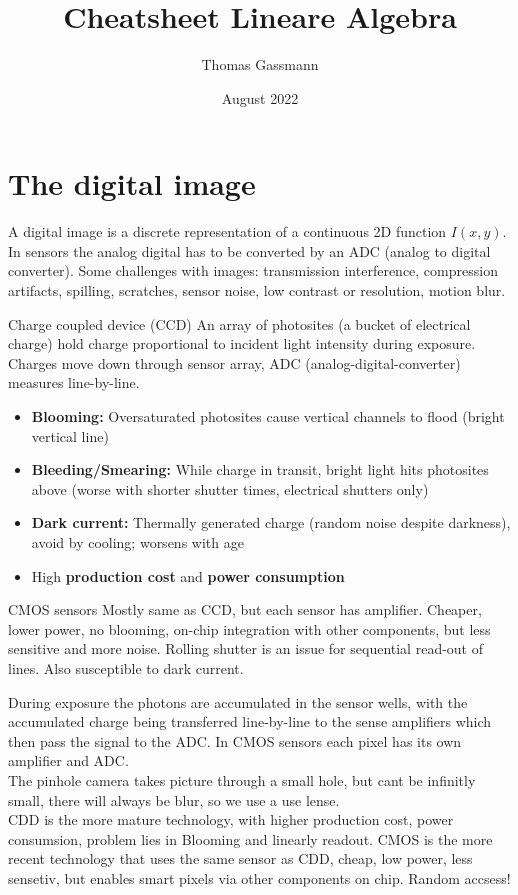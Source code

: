 \documentclass[a4paper,9pt]{article}
\title{Cheatsheet Lineare Algebra}
\author{Thomas Gassmann}
\date{August 2022}
\begin{document}
\section{The digital image}
A digital image is a discrete representation of a continuous 2D function $I(x,y)$. In sensors the analog digital has to be converted by an ADC (analog to digital converter). 
Some challenges with images: transmission interference, compression artifacts, spilling, scratches, sensor noise, low contrast or resolution, motion blur.
\begin{subbox}{Charge coupled device (CCD)}
An array of photosites (a bucket of electrical charge) hold charge proportional to incident light intensity during exposure. Charges move down through sensor array, ADC (analog-digital-converter) measures line-by-line.
\begin{itemize}
  \item \textbf{Blooming:} Oversaturated photosites cause vertical channels to flood (bright vertical line)
  \item \textbf{Bleeding/Smearing:} While charge in transit, bright light hits photosites above (worse with shorter shutter times, electrical shutters only)
  \item \textbf{Dark current:} Thermally generated charge (random noise despite darkness), avoid by cooling; worsens with age
  \item High \textbf{production cost} and \textbf{power consumption}
\end{itemize}
\end{subbox}
\begin{subbox}{CMOS sensors}
Mostly same as CCD, but each sensor has amplifier. Cheaper, lower power, no blooming, on-chip integration with other components, but less sensitive and more noise. Rolling shutter is an issue for sequential read-out of lines. Also susceptible to dark current.
\end{subbox}
During exposure the photons are accumulated in the sensor wells, with the accumulated charge being transferred line-by-line to the sense amplifiers which
then pass the signal to the ADC. In CMOS sensors each pixel has its own amplifier and ADC.\\
The pinhole camera takes picture through a small hole, but cant be infinitly small, there will always be blur, so we use a use lense.\\
CDD is the more mature technology, with higher production cost, power consumsion, problem lies in Blooming and linearly readout.
CMOS is the more recent technology that uses the same sensor as CDD, cheap, low power, less sensetiv, but enables smart pixels via other components on chip. Random accsess!
\end{document}
